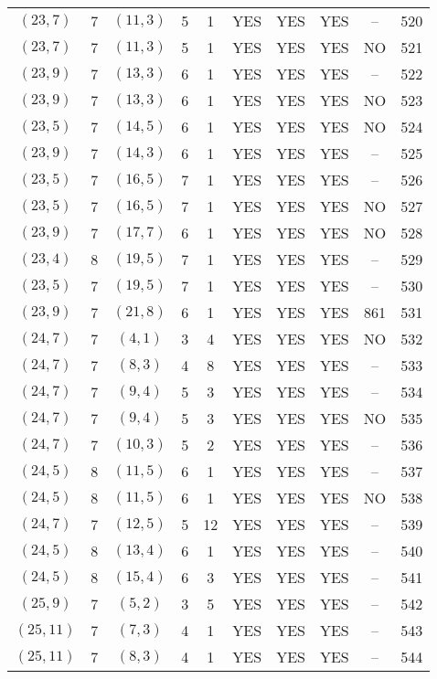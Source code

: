 \begin{longtable}{|c|c|c|c|c|c|c|c|c|c|}
$(23, 7)$ & 7 & $(11, 3)$ & 5 & 1 & YES & YES & YES & -- & 520\\
$(23, 7)$ & 7 & $(11, 3)$ & 5 & 1 & YES & YES & YES & NO & 521\\
$(23, 9)$ & 7 & $(13, 3)$ & 6 & 1 & YES & YES & YES & -- & 522\\
$(23, 9)$ & 7 & $(13, 3)$ & 6 & 1 & YES & YES & YES & NO & 523\\
$(23, 5)$ & 7 & $(14, 5)$ & 6 & 1 & YES & YES & YES & NO & 524\\
$(23, 9)$ & 7 & $(14, 3)$ & 6 & 1 & YES & YES & YES & -- & 525\\
$(23, 5)$ & 7 & $(16, 5)$ & 7 & 1 & YES & YES & YES & -- & 526\\
$(23, 5)$ & 7 & $(16, 5)$ & 7 & 1 & YES & YES & YES & NO & 527\\
$(23, 9)$ & 7 & $(17, 7)$ & 6 & 1 & YES & YES & YES & NO & 528\\
$(23, 4)$ & 8 & $(19, 5)$ & 7 & 1 & YES & YES & YES & -- & 529\\
$(23, 5)$ & 7 & $(19, 5)$ & 7 & 1 & YES & YES & YES & -- & 530\\
$(23, 9)$ & 7 & $(21, 8)$ & 6 & 1 & YES & YES & YES & 861 & 531\\
$(24, 7)$ & 7 & $(4, 1)$ & 3 & 4 & YES & YES & YES & NO & 532\\
$(24, 7)$ & 7 & $(8, 3)$ & 4 & 8 & YES & YES & YES & -- & 533\\
$(24, 7)$ & 7 & $(9, 4)$ & 5 & 3 & YES & YES & YES & -- & 534\\
$(24, 7)$ & 7 & $(9, 4)$ & 5 & 3 & YES & YES & YES & NO & 535\\
$(24, 7)$ & 7 & $(10, 3)$ & 5 & 2 & YES & YES & YES & -- & 536\\
$(24, 5)$ & 8 & $(11, 5)$ & 6 & 1 & YES & YES & YES & -- & 537\\
$(24, 5)$ & 8 & $(11, 5)$ & 6 & 1 & YES & YES & YES & NO & 538\\
$(24, 7)$ & 7 & $(12, 5)$ & 5 & 12 & YES & YES & YES & -- & 539\\
$(24, 5)$ & 8 & $(13, 4)$ & 6 & 1 & YES & YES & YES & -- & 540\\
$(24, 5)$ & 8 & $(15, 4)$ & 6 & 3 & YES & YES & YES & -- & 541\\
$(25, 9)$ & 7 & $(5, 2)$ & 3 & 5 & YES & YES & YES & -- & 542\\
$(25, 11)$ & 7 & $(7, 3)$ & 4 & 1 & YES & YES & YES & -- & 543\\
$(25, 11)$ & 7 & $(8, 3)$ & 4 & 1 & YES & YES & YES & -- & 544\\

\end{longtable}
